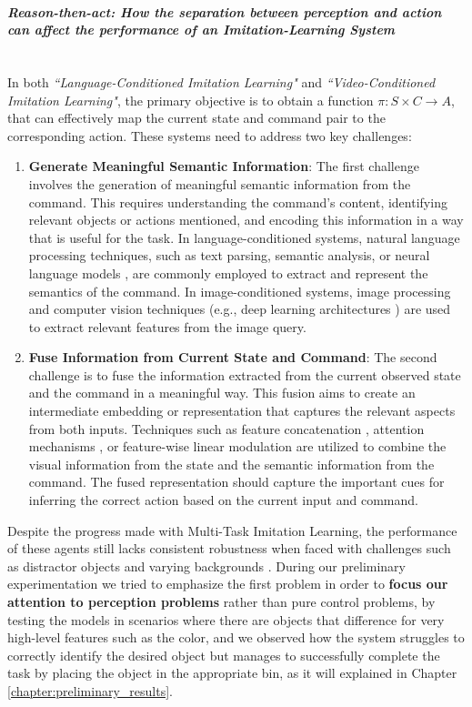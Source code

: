 \paragraph{\textit{Reason-then-act: How the separation between perception and action can affect the performance of an Imitation-Learning System}} \mbox{} \\
In both \textit{``Language-Conditioned Imitation Learning"} and \textit{``Video-Conditioned Imitation Learning"}, the primary objective is to obtain a function $\pi: S \times C \rightarrow A $, that can effectively map the current state and command pair to the corresponding action. These systems need to address two key challenges:
\begin{enumerate}
    \item \textbf{Generate Meaningful Semantic Information}: The first challenge involves the generation of meaningful semantic information from the command. This requires understanding the command's content, identifying relevant objects or actions mentioned, and encoding this information in a way that is useful for the task. In language-conditioned systems, natural language processing techniques, such as text parsing, semantic analysis, or neural language models \cite{stepputtis2020language,jang2022bc_z,brohan2022rt}, are commonly employed to extract and represent the semantics of the command. In image-conditioned systems, image processing and computer vision techniques (e.g., deep learning architectures \cite{dasari2021transformers_one_shot,mandi2022towards_more_generalizable_one_shot}) are used to extract relevant features from the image query.
    \item \textbf{Fuse Information from Current State and Command}: The second challenge is to fuse the information extracted from the current observed state and the command in a meaningful way. This fusion aims to create an intermediate embedding or representation that captures the relevant aspects from both inputs. Techniques such as feature concatenation \cite{james2018task_embedded,stepputtis2020language,bhutani2022attentive_one_shot}, attention mechanisms \cite{dasari2021transformers_one_shot,mandi2022towards_more_generalizable_one_shot}, or feature-wise linear modulation \cite{brohan2022rt} are utilized to combine the visual information from the state and the semantic information from the command. The fused representation should capture the important cues for inferring the correct action based on the current input and command.
\end{enumerate}
Despite the progress made with Multi-Task Imitation Learning, the performance of these agents still lacks consistent robustness when faced with challenges such as distractor objects and varying backgrounds \cite{brohan2022rt}. During our preliminary experimentation we tried to emphasize the first problem in order to \textbf{focus our attention to perception problems} rather than pure control problems, by testing the models in scenarios where there are objects that difference for very high-level features such as the color, and we observed how the system struggles to correctly identify the desired object but manages to successfully complete the task by placing the object in the appropriate bin, as it will explained in Chapter \ref{chapter:preliminary_results}.
